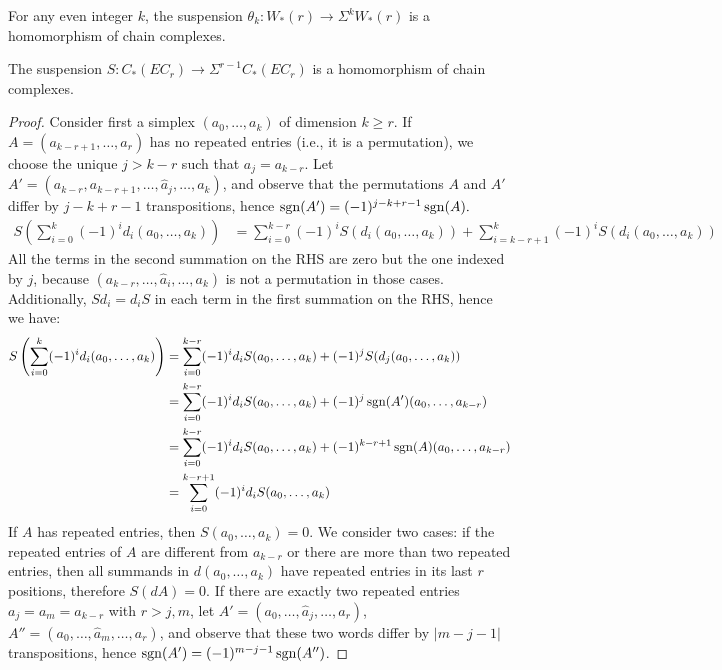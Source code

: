\begin{remark}
	For any even integer $k$, the suspension $\theta_{k}\colon W_*(r)\to \Sigma^{k}W_*(r)$ is a homomorphism of chain complexes.
\end{remark}

\begin{lemma}
	The suspension $S\colon C_*(EC_r)\to \Sigma^{r-1}C_*(EC_r)$ is a homomorphism of chain complexes.
\end{lemma}

\begin{proof}
	Consider first a simplex $(a_0,\ldots,a_k)$ of dimension $k\geq r$. If $A=(a_{k-r+1},\ldots,a_{r})$ has no repeated entries (i.e., it is a permutation), we choose the unique $j>k-r$ such that $a_j = a_{k-r}$. Let $A' = (a_{k-r},a_{k-r+1},\ldots,\hat{a}_j,\ldots,a_k)$, and observe that the permutations $A$ and $A'$ differ by $j-k+r-1$ transpositions, hence $\operatorname*{sgn}(A') = (-1)^{j-k+r-1}\operatorname*{sgn}(A).$
	\begin{align*}
		S\left(\sum_{i=0}^k (-1)^id_i (a_0,\ldots,a_k)\right)
		&= \sum_{i=0}^{k-r} (-1)^iS(d_i (a_0,\ldots,a_k)) + \sum_{i=k-r+1}^{k} (-1)^iS(d_i (a_0,\ldots,a_k))
	\end{align*}
	All the terms in the second summation on the RHS are zero but the one indexed by $j$, because $(a_{k-r},\ldots,\hat{a}_i,\ldots,a_k)$ is not a permutation in those cases. Additionally, $Sd_i = d_{i}S$ in each term in the first summation on the RHS, hence we have:
	\begin{align*}
		S\left(\sum_{i=0}^k (-1)^id_i (a_0,\ldots,a_k)\right)
		&= \sum_{i=0}^{k-r} (-1)^i d_i S(a_0,\ldots,a_k) + (-1)^j S(d_j (a_0,\ldots,a_k)) \\
		&= \sum_{i=0}^{k-r} (-1)^i d_i S(a_0,\ldots,a_k) + (-1)^{j}\operatorname*{sgn}(A')(a_0,\ldots,a_{k-r}) \\
		&= \sum_{i=0}^{k-r} (-1)^i d_i S(a_0,\ldots,a_k) + (-1)^{k-r+1}\operatorname*{sgn}(A)(a_0,\ldots,a_{k-r}) \\
		&= \sum_{i=0}^{k-r+1} (-1)^i d_i S(a_0,\ldots,a_k)
	\end{align*}
	If $A$ has repeated entries, then $S(a_0,\ldots,a_k) = 0$. We consider two cases: if the repeated entries of $A$ are different from $a_{k-r}$ or there are more than two repeated entries, then all summands in $d(a_0,\ldots,a_k)$ have repeated entries in its last $r$ positions, therefore $S(dA)=0$. If there are exactly two repeated entries $a_j=a_m = a_{k-r}$ with $r>j,m$, let $A' = (a_0,\ldots,\hat{a}_j,\ldots,a_{r})$, $A'' = (a_0,\ldots,\hat{a}_m,\ldots,a_{r})$, and observe that these two words differ by $|m-j-1|$ transpositions, hence $\operatorname*{sgn}(A') = (-1)^{m-j-1}\operatorname*{sgn}(A'')$.

\end{proof}
